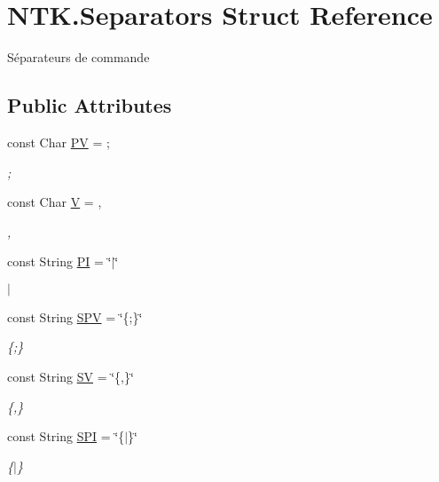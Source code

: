 \hypertarget{struct_n_t_k_1_1_separators}{}\section{N\+T\+K.\+Separators Struct Reference}
\label{struct_n_t_k_1_1_separators}


Séparateurs de commande  


\subsection*{Public Attributes}
\begin{DoxyCompactItemize}
\item 
const Char \mbox{\hyperlink{struct_n_t_k_1_1_separators_ad16bb38dc22e45801d45b2eeb614e6a0}{PV}} = \textquotesingle{};\textquotesingle{}
\begin{DoxyCompactList}\small\item\em ; \end{DoxyCompactList}\item 
const Char \mbox{\hyperlink{struct_n_t_k_1_1_separators_a1117cf18684a7acc7b5f90feb2252356}{V}} = \textquotesingle{},\textquotesingle{}
\begin{DoxyCompactList}\small\item\em , \end{DoxyCompactList}\item 
const String \mbox{\hyperlink{struct_n_t_k_1_1_separators_a0948e5698ee8208e78c17ec45773f384}{PI}} = \char`\"{}$\vert$\char`\"{}
\begin{DoxyCompactList}\small\item\em $\vert$ \end{DoxyCompactList}\item 
const String \mbox{\hyperlink{struct_n_t_k_1_1_separators_a6bee799713d32d320f3a4fd17a5882f5}{S\+PV}} = \char`\"{}\{;\}\char`\"{}
\begin{DoxyCompactList}\small\item\em \{;\} \end{DoxyCompactList}\item 
const String \mbox{\hyperlink{struct_n_t_k_1_1_separators_a3c9d04d23a6399e4d7857b10a7b5206b}{SV}} = \char`\"{}\{,\}\char`\"{}
\begin{DoxyCompactList}\small\item\em \{,\} \end{DoxyCompactList}\item 
const String \mbox{\hyperlink{struct_n_t_k_1_1_separators_ab55c4094d17f022ac5cc628ae8d2b761}{S\+PI}} = \char`\"{}\{$\vert$\}\char`\"{}
\begin{DoxyCompactList}\small\item\em \{$\vert$\} \end{DoxyCompactList}\end{DoxyCompactItemize}


